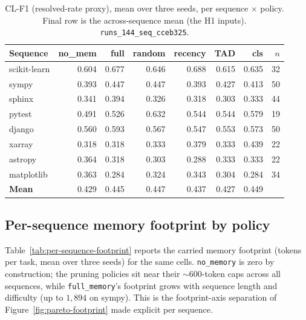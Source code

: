\begin{table}[htbp]
  \centering
  \caption{CL-F1 (resolved-rate proxy), mean over three seeds, per sequence $\times$ policy.
  Final row is the across-sequence mean (the H1 inputs). \texttt{runs\_144\_seq\_cceb325}.}
  \label{tab:per-sequence}
  \small
  \begin{tabular}{lrrrrrrr}
    \toprule
    Sequence & no\_mem & full & random & recency & TAD & cls & $n$ \\
    \midrule
    scikit-learn & 0.604 & 0.677 & 0.646 & 0.688 & 0.615 & 0.635 & 32 \\
    sympy        & 0.393 & 0.447 & 0.447 & 0.393 & 0.427 & 0.413 & 50 \\
    sphinx       & 0.341 & 0.394 & 0.326 & 0.318 & 0.303 & 0.333 & 44 \\
    pytest       & 0.491 & 0.526 & 0.632 & 0.544 & 0.544 & 0.579 & 19 \\
    django       & 0.560 & 0.593 & 0.567 & 0.547 & 0.553 & 0.573 & 50 \\
    xarray       & 0.318 & 0.318 & 0.333 & 0.379 & 0.333 & 0.439 & 22 \\
    astropy      & 0.364 & 0.318 & 0.303 & 0.288 & 0.333 & 0.333 & 22 \\
    matplotlib   & 0.363 & 0.284 & 0.324 & 0.343 & 0.304 & 0.284 & 34 \\
    \midrule
    \textbf{Mean} & 0.429 & 0.445 & 0.447 & 0.437 & 0.427 & 0.449 & \\
    \bottomrule
  \end{tabular}
\end{table}

\subsection{Per-sequence memory footprint by policy}

Table~\ref{tab:per-sequence-footprint} reports the carried memory footprint (tokens per task,
mean over three seeds) for the same cells. \texttt{no\_memory} is zero by construction; the
pruning policies sit near their $\sim\!600$-token caps across all sequences, while
\texttt{full\_memory}'s footprint grows with sequence length and difficulty (up to $1{,}894$
on sympy). This is the footprint-axis separation of Figure~\ref{fig:pareto-footprint} made
explicit per sequence.

